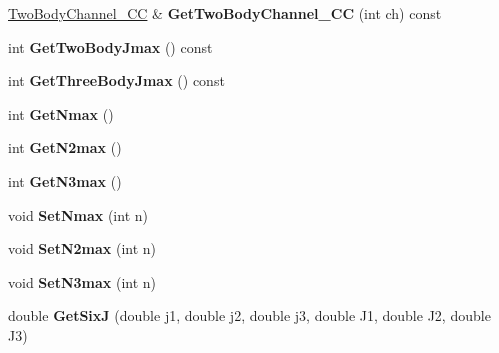 \begin{DoxyCompactItemize}
\item 
\hypertarget{classModelSpace_a6709279838180ef0a6745320c9ad6926}{\hyperlink{classTwoBodyChannel__CC}{Two\-Body\-Channel\-\_\-\-C\-C} \& {\bfseries Get\-Two\-Body\-Channel\-\_\-\-C\-C} (int ch) const }\label{classModelSpace_a6709279838180ef0a6745320c9ad6926}

\item 
\hypertarget{classModelSpace_a3cbf323130388fae05fed1b59c5bac90}{int {\bfseries Get\-Two\-Body\-Jmax} () const }\label{classModelSpace_a3cbf323130388fae05fed1b59c5bac90}

\item 
\hypertarget{classModelSpace_a23ec9e8797755abfc0986b2e2c73a056}{int {\bfseries Get\-Three\-Body\-Jmax} () const }\label{classModelSpace_a23ec9e8797755abfc0986b2e2c73a056}

\item 
\hypertarget{classModelSpace_aa17b852a2902e4ec22a5c87f53de2dea}{int {\bfseries Get\-Nmax} ()}\label{classModelSpace_aa17b852a2902e4ec22a5c87f53de2dea}

\item 
\hypertarget{classModelSpace_a415e7663769bcab236a66c9914f9ff13}{int {\bfseries Get\-N2max} ()}\label{classModelSpace_a415e7663769bcab236a66c9914f9ff13}

\item 
\hypertarget{classModelSpace_a15a5f8ef44f769c052ae1ae5d475fc01}{int {\bfseries Get\-N3max} ()}\label{classModelSpace_a15a5f8ef44f769c052ae1ae5d475fc01}

\item 
\hypertarget{classModelSpace_a1a50d734edaef5cb3bd79a4707ef1e82}{void {\bfseries Set\-Nmax} (int n)}\label{classModelSpace_a1a50d734edaef5cb3bd79a4707ef1e82}

\item 
\hypertarget{classModelSpace_ab13111671fc76cf1c52b98a3f78a1dcd}{void {\bfseries Set\-N2max} (int n)}\label{classModelSpace_ab13111671fc76cf1c52b98a3f78a1dcd}

\item 
\hypertarget{classModelSpace_a432f3913aa487bf7fc7c4eb5a2197599}{void {\bfseries Set\-N3max} (int n)}\label{classModelSpace_a432f3913aa487bf7fc7c4eb5a2197599}

\item 
\hypertarget{classModelSpace_a716c2bf4a6b42c1c27579b0b7804252e}{double {\bfseries Get\-Six\-J} (double j1, double j2, double j3, double J1, double J2, double J3)}\label{classModelSpace_a716c2bf4a6b42c1c27579b0b7804252e}


\end{DoxyCompactItemize}
